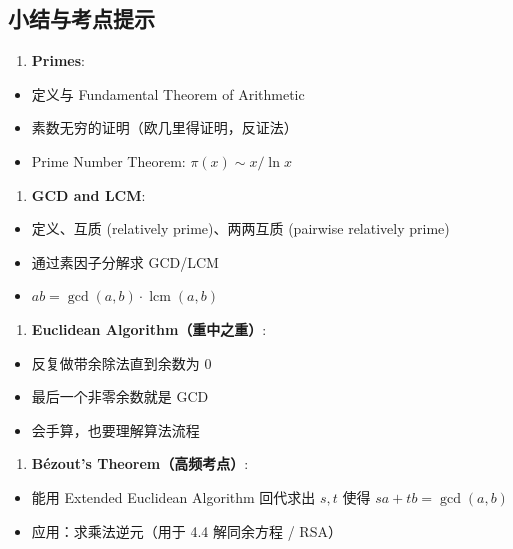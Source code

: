 \documentclass[10pt,a4paper,openany]{ctexbook}
\theoremstyle{definition}
\theoremstyle{remark}
\begin{document}
\vspace{-2pt}

\subsection{小结与考点提示}

\begin{enumerate}
\item \textbf{Primes}:
\end{enumerate}

\begin{itemize}
\item 定义与 Fundamental Theorem of Arithmetic
\item 素数无穷的证明（欧几里得证明，反证法）
\item Prime Number Theorem: $\pi(x) \sim x/\ln x$

\end{itemize}

\begin{enumerate}
\item \textbf{GCD and LCM}:
\end{enumerate}

\begin{itemize}
\item 定义、互质 (relatively prime)、两两互质 (pairwise relatively prime)
\item 通过素因子分解求 GCD/LCM
\item $ab = \gcd(a,b) \cdot \operatorname{lcm}(a,b)$

\end{itemize}

\begin{enumerate}
\item \textbf{Euclidean Algorithm（重中之重）}:
\end{enumerate}

\begin{itemize}
\item 反复做带余除法直到余数为 0
\item 最后一个非零余数就是 GCD
\item 会手算，也要理解算法流程

\end{itemize}

\begin{enumerate}
\item \textbf{B\'ezout's Theorem（高频考点）}:
\end{enumerate}

\begin{itemize}
\item 能用 Extended Euclidean Algorithm 回代求出 $s, t$ 使得 $sa + tb = \gcd(a,b)$
\item 应用：求乘法逆元（用于 4.4 解同余方程 / RSA）

\end{itemize}
\end{document}
